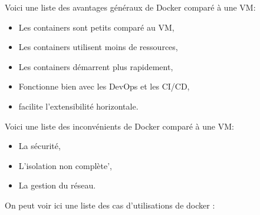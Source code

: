 \documentclass[
    iai, %
    il, %
]{heig-tb}
\begin{document}
Voici une liste des avantages généraux de Docker comparé à une VM:
\begin{itemize}
    \item Les containers sont petits comparé au VM, \cite{koukia}
    \item Les containers utilisent moins de ressources, \cite{koukia}
    \item Les containers démarrent plus rapidement, \cite{koukia}
    \item Fonctionne bien avec les DevOps et les CI/CD, \cite{koukia,data-flair-pros-cons,data-flair-use-cases}
    \item facilite l'extensibilité horizontale. \cite{data-flair-use-cases}
\end{itemize}

Voici une liste des inconvénients de Docker comparé à une VM:
\begin{itemize}
    \item La sécurité, \cite{koukia}
    \item L'isolation non complète', \cite{koukia}
    \item La gestion du réseau. \cite{koukia}
\end{itemize}


On peut voir ici une liste des cas d'utilisations de docker \cite{data-flair-use-cases}: %


\end{document}

